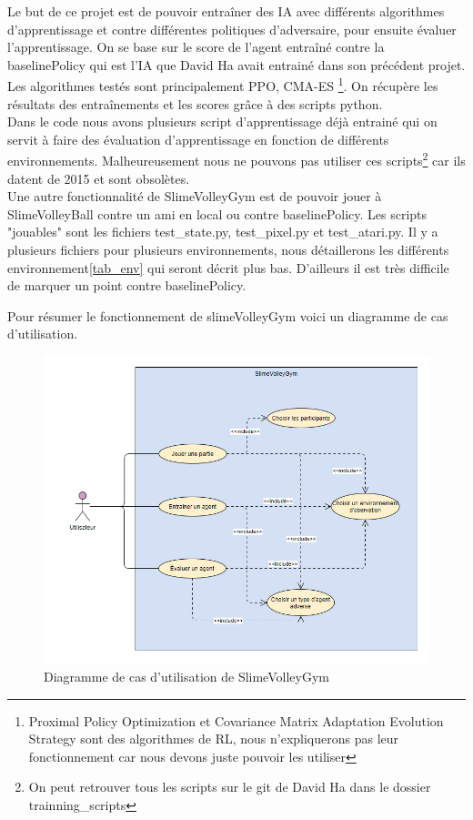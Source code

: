 \documentclass[11pt, a4paper]{article}
\begin{document}
	Le but de ce projet est de pouvoir entraîner des IA avec différents algorithmes d'apprentissage et contre différentes politiques d'adversaire, pour ensuite évaluer l'apprentissage. On se base sur le score de l'agent entraîné contre la baselinePolicy qui est l'IA que David Ha avait entrainé dans son précédent projet. Les algorithmes testés sont principalement PPO, CMA-ES \footnote{Proximal Policy Optimization et Covariance Matrix Adaptation Evolution Strategy sont des algorithmes de RL, nous n'expliquerons pas leur fonctionnement car nous devons juste pouvoir les utiliser}. On récupère les résultats des entraînements et les scores grâce à des scripts python. \\
	Dans le code nous avons plusieurs script d'apprentissage déjà entrainé qui on servit à faire des évaluation d'apprentissage en fonction de différents environnements. Malheureusement nous ne pouvons pas utiliser ces scripts\footnote{On peut retrouver tous les scripts sur le git de David Ha dans le dossier trainning\_scripts} car ils datent de 2015 et sont obsolètes.\\

	Une autre fonctionnalité de SlimeVolleyGym est de pouvoir jouer à SlimeVolleyBall contre un ami en local ou contre baselinePolicy. Les scripts "jouables" sont les fichiers test\_state.py, test\_pixel.py et test\_atari.py. Il y a plusieurs fichiers pour plusieurs environnements, nous détaillerons les différents environnement\ref{tab_env} qui seront décrit plus bas. D'ailleurs il est très difficile de marquer un point contre baselinePolicy.

	Pour résumer le fonctionnement de slimeVolleyGym voici un diagramme de cas d'utilisation.
	\begin{figure}[H]
		\centering
		\includegraphics[scale=0.6]{images/cas_utilisation.PNG}
		\caption {Diagramme de cas d'utilisation de SlimeVolleyGym}
	\end{figure}
\end{document}
